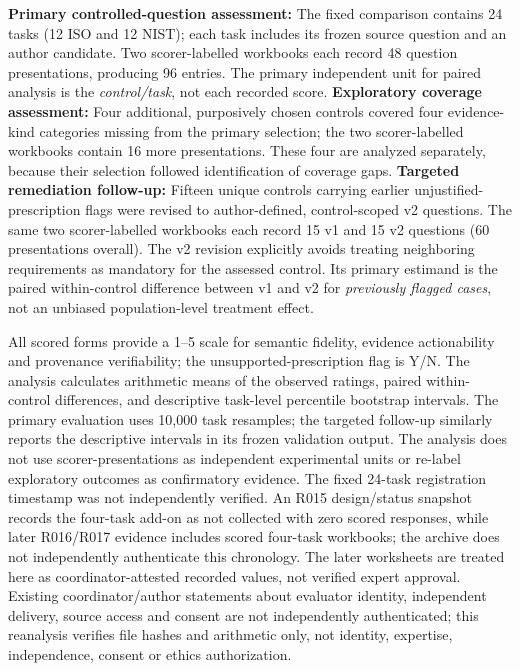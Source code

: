\documentclass[12pt,a4paper]{article}
\begin{document}
\textbf{Primary controlled-question assessment:} The fixed comparison contains 24 tasks (12 ISO and 12 NIST); each task includes its frozen source question and an author candidate. Two scorer-labelled workbooks each record 48 question presentations, producing 96 entries. The primary independent unit for paired analysis is the \emph{control/task}, not each recorded score. \textbf{Exploratory coverage assessment:} Four additional, purposively chosen controls covered four evidence-kind categories missing from the primary selection; the two scorer-labelled workbooks contain 16 more presentations. These four are analyzed separately, because their selection followed identification of coverage gaps. \textbf{Targeted remediation follow-up:} Fifteen unique controls carrying earlier unjustified-prescription flags were revised to author-defined, control-scoped v2 questions. The same two scorer-labelled workbooks each record 15 v1 and 15 v2 questions (60 presentations overall). The v2 revision explicitly avoids treating neighboring requirements as mandatory for the assessed control. Its primary estimand is the paired within-control difference between v1 and v2 for \emph{previously flagged cases}, not an unbiased population-level treatment effect.

All scored forms provide a 1--5 scale for semantic fidelity, evidence actionability and provenance verifiability; the unsupported-prescription flag is Y/N. The analysis calculates arithmetic means of the observed ratings, paired within-control differences, and descriptive task-level percentile bootstrap intervals. The primary evaluation uses 10,000 task resamples; the targeted follow-up similarly reports the descriptive intervals in its frozen validation output. The analysis does not use scorer-presentations as independent experimental units or re-label exploratory outcomes as confirmatory evidence. The fixed 24-task registration timestamp was not independently verified. An R015 design/status snapshot records the four-task add-on as not collected with zero scored responses, while later R016/R017 evidence includes scored four-task workbooks; the archive does not independently authenticate this chronology. The later worksheets are treated here as coordinator-attested recorded values, not verified expert approval. Existing coordinator/author statements about evaluator identity, independent delivery, source access and consent are not independently authenticated; this reanalysis verifies file hashes and arithmetic only, not identity, expertise, independence, consent or ethics authorization.
\end{document}
